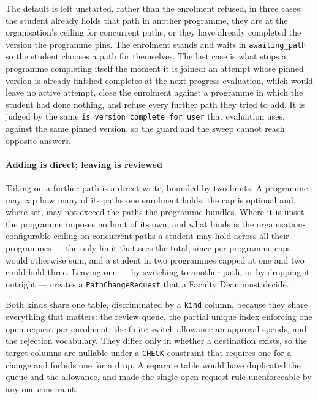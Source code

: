 The default is left unstarted, rather than the enrolment refused, in three cases: the student already holds that path in another programme, they are at the organisation's ceiling for concurrent paths, or they have already completed the version the programme pins. The enrolment stands and waits in \texttt{awaiting\_path} so the student chooses a path for themselves. The last case is what stops a programme completing itself the moment it is joined: an attempt whose pinned version is already finished completes at the next progress evaluation, which would leave no active attempt, close the enrolment against a programme in which the student had done nothing, and refuse every further path they tried to add. It is judged by the same \texttt{is\_version\_complete\_for\_user} that evaluation uses, against the same pinned version, so the guard and the sweep cannot reach opposite answers.

\paragraph{Adding is direct; leaving is reviewed}
Taking on a further path is a direct write, bounded by two limits. A programme may cap how many of its paths one enrolment holds; the cap is optional and, where set, may not exceed the paths the programme bundles. Where it is unset the programme imposes no limit of its own, and what binds is the organisation-configurable ceiling on concurrent paths a student may hold across all their programmes --- the only limit that sees the total, since per-programme caps would otherwise sum, and a student in two programmes capped at one and two could hold three. Leaving one --- by switching to another path, or by dropping it outright --- creates a \texttt{PathChangeRequest} that a Faculty Dean must decide.

Both kinds share one table, discriminated by a \texttt{kind} column, because they share everything that matters: the review queue, the partial unique index enforcing one open request per enrolment, the finite switch allowance an approval spends, and the rejection vocabulary. They differ only in whether a destination exists, so the target columns are nullable under a \texttt{CHECK} constraint that requires one for a change and forbids one for a drop. A separate table would have duplicated the queue and the allowance, and made the single-open-request rule unenforceable by any one constraint.

